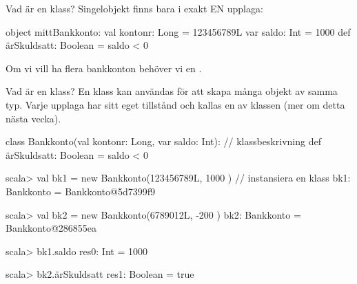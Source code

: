 
\begin{Slide}{Vad är en klass?}
Singelobjekt finns bara i exakt EN upplaga:
\begin{Code}
object mittBankkonto:
  val kontonr: Long        = 123456789L
  var saldo: Int           = 1000
  def ärSkuldsatt: Boolean = saldo < 0
\end{Code}
Om vi vill ha flera bankkonton behöver vi en  .
\end{Slide}

\begin{Slide}{Vad är en klass?}
En klass kan användas för att skapa många objekt av samma typ. Varje upplaga har sitt eget tillstånd och kallas en  av klassen (mer om detta nästa vecka).
\begin{Code}
class Bankkonto(val kontonr: Long, var saldo: Int): // klassbeskrivning
  def ärSkuldsatt: Boolean = saldo < 0
\end{Code}
\pause
\begin{REPL}
scala> val bk1 = new Bankkonto(123456789L, 1000 )   // instansiera en klass
bk1: Bankkonto = Bankkonto@5d7399f9

scala> val bk2 = new Bankkonto(6789012L, -200 )
bk2: Bankkonto = Bankkonto@286855ea

scala> bk1.saldo
res0: Int = 1000

scala> bk2.ärSkuldsatt
res1: Boolean = true
\end{REPL}
\end{Slide}

